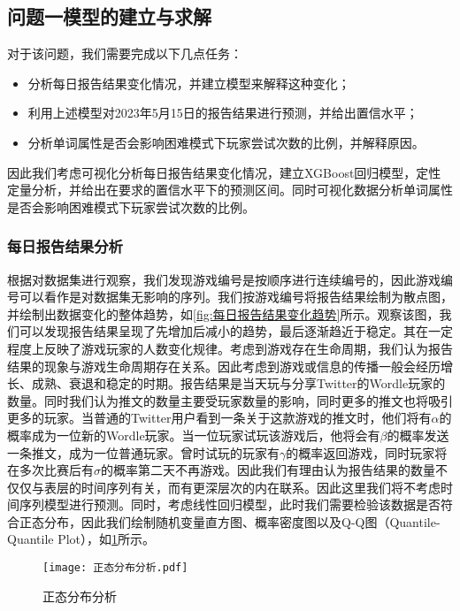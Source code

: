 \documentclass{MathModeling}
\begin{document}
	\subsection{问题一模型的建立与求解}
	对于该问题，我们需要完成以下几点任务：
	\begin{itemize}
		\item 分析每日报告结果变化情况，并建立模型来解释这种变化；
		\item 利用上述模型对2023年5月15日的报告结果进行预测，并给出置信水平；
		\item 分析单词属性是否会影响困难模式下玩家尝试次数的比例，并解释原因。
	\end{itemize}
	
	因此我们考虑可视化分析每日报告结果变化情况，建立XGBoost回归模型，定性定量分析，并给出在要求的置信水平下的预测区间。同时可视化数据分析单词属性是否会影响困难模式下玩家尝试次数的比例。
	\subsubsection{每日报告结果分析}\label{XGBoost}
	根据对数据集进行观察，我们发现游戏编号是按顺序进行连续编号的，因此游戏编号可以看作是对数据集无影响的序列。我们按游戏编号将报告结果绘制为散点图，并绘制出数据变化的整体趋势，如\textcolor{blue}{\cref{fig:每日报告结果变化趋势}}所示。观察该图，我们可以发现报告结果呈现了先增加后减小的趋势，最后逐渐趋近于稳定。其在一定程度上反映了游戏玩家的人数变化规律。考虑到游戏存在生命周期，我们认为报告结果的现象与游戏生命周期存在关系。因此考虑到游戏或信息的传播一般会经历增长、成熟、衰退和稳定的时期。报告结果是当天玩与分享Twitter的Wordle玩家的数量。同时我们认为推文的数量主要受玩家数量的影响，同时更多的推文也将吸引更多的玩家。当普通的Twitter用户看到一条关于这款游戏的推文时，他们将有$\alpha$的概率成为一位新的Wordle玩家。当一位玩家试玩该游戏后，他将会有$\beta$的概率发送一条推文，成为一位普通玩家。曾时试玩的玩家有$\gamma$的概率返回游戏，同时玩家将在多次比赛后有$\sigma$的概率第二天不再游戏。因此我们有理由认为报告结果的数量不仅仅与表层的时间序列有关，而有更深层次的内在联系。因此这里我们将不考虑时间序列模型进行预测。同时，考虑线性回归模型，此时我们需要检验该数据是否符合正态分布，因此我们绘制随机变量直方图、概率密度图以及Q-Q图（Quantile-Quantile Plot），如\textcolor{blue}{\cref{fig:正态分布分析}}所示。
	\begin{figure}[H]
		\centering
		\texttt{[image: 正态分布分析.pdf]}
		\caption{正态分布分析}
		\label{fig:正态分布分析}
	\end{figure}
	
\end{document}
